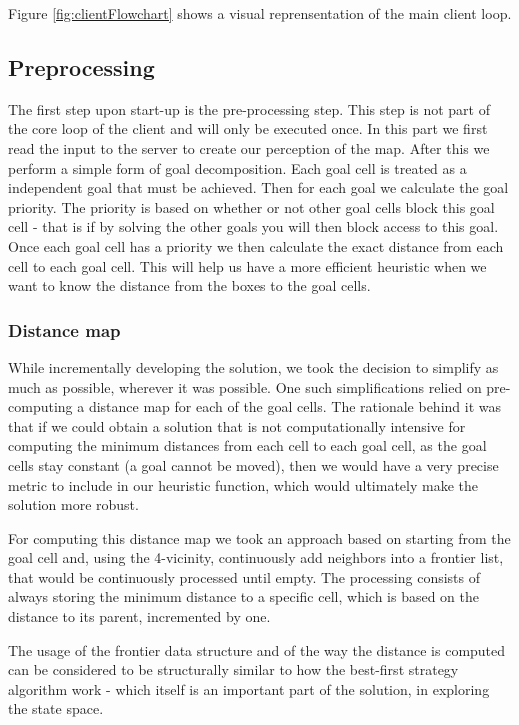 \documentclass[letterpaper]{article}
\begin{document}
Figure \ref{fig:clientFlowchart} shows a visual reprensentation of the main client loop.

\subsection{Preprocessing}
The first step upon start-up is the pre-processing step. This step is not part of the core loop of the client and will only be executed once. In this part we first read the input to the server to create our perception of the map. After this we perform a simple form of goal decomposition. Each goal cell is treated as a independent goal that must be achieved. Then for each goal we calculate the goal priority. The priority is based on whether or not other goal cells block this goal cell - that is if by solving the other goals you will then block access to this goal. Once each goal cell has a priority we then calculate the exact distance from each cell to each goal cell. This will help us have a more efficient heuristic when we want to know the distance from the boxes to the goal cells.

\subsubsection{Distance map}

While incrementally developing the solution, we took the decision to simplify as much as possible, wherever it was possible. One such simplifications relied on pre-computing a distance map for each of the goal cells. The rationale behind it was that if we could obtain a solution that is not computationally intensive for computing the minimum distances from each cell to each goal cell, as the goal cells stay constant (a goal cannot be moved), then we would have a very precise metric to include in our heuristic function, which would ultimately make the solution more robust.

For computing this distance map we took an approach based on starting from the goal cell and, using the 4-vicinity, continuously add neighbors into a frontier list, that would be continuously processed until empty. The processing consists of always storing the minimum distance to a specific cell, which is based on the distance to its parent, incremented by one.

The usage of the frontier data structure and of the way the distance is computed can be considered to be structurally similar to how the best-first strategy algorithm work - which itself is an important part of the solution, in exploring the state space.
\end{document}

